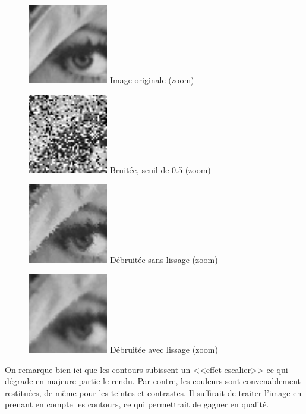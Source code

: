 \documentclass{article}
\begin{document}
		\begin{figure}[!ht]
			\centering
			\begin{minipage}[t]{3.5cm}
				\centering
				\includegraphics[width=3.5cm,height=3.5cm]{lenaZOOM.jpg}
				Image originale (zoom)
			\end{minipage}
			\begin{minipage}[t]{3.5cm}
				\centering
				\includegraphics[width=3.5cm,height=3.5cm]{SaltAndPepper/50_ZOOM.jpg}
				Bruitée, seuil de 0.5 (zoom)
			\end{minipage}
			\begin{minipage}[t]{3.5cm}
				\centering
				\includegraphics[width=3.5cm,height=3.5cm]{SaltAndPepper/unset_50_ZOOM.jpg}
				Débruitée sans lissage (zoom)
			\end{minipage}
			\begin{minipage}[t]{3.5cm}
				\centering
				\includegraphics[width=3.5cm,height=3.5cm]{SaltAndPepper/unset_50_liss_ZOOM.jpg}
				Débruitée avec lissage (zoom)
			\end{minipage}
		\end{figure}
		On remarque bien ici que les contours subissent un <<effet escalier>> ce qui dégrade en majeure partie le rendu. Par contre, les couleurs sont convenablement restituées, de même pour les teintes et contrastes. Il suffirait de traiter l'image en prenant en compte les contours, ce qui permettrait de gagner en qualité.
\end{document}
